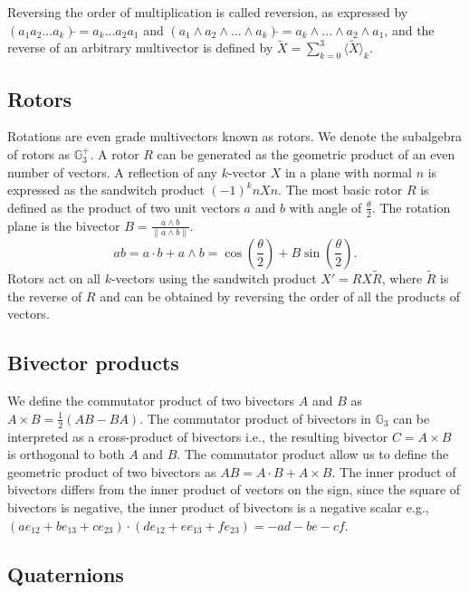 \documentclass{birkjour}
\numberwithin{equation}{section}
\begin{document}
Reversing the order of multiplication is called reversion, as expressed by $(a_1 a_2 ... a_k)\tilde{} = a_k ... a_2 a_1$ and $(a_1 \wedge a_2 \wedge ... \wedge a_k)\tilde{} = a_k \wedge ... \wedge a_2 \wedge a_1$, and the reverse of an arbitrary multivector is defined by $\tilde{X} = \sum_{k=0}^3 { \langle \tilde{X} \rangle_k }$.

\subsection{Rotors}

Rotations are even grade multivectors known as rotors. We denote the subalgebra of rotors as $\mathbb{G}^{+}_3$. A rotor $R$ can be generated as the geometric product of an even number of vectors. A reflection of any $k$-vector $X$ in a plane with normal $n$ is expressed as the sandwitch product $(-1)^k n X n$. The most basic rotor $R$ is defined as the product of two unit vectors $a$ and $b$ with angle of $\frac{\theta}{2}$. The rotation plane is the bivector $B = \frac{a \wedge b}{\| a \wedge b \|}$.
\begin{equation}
a b = a \cdot b + a \wedge b = \cos\left( \frac{\theta}{2} \right) + B \sin\left( \frac{\theta}{2} \right).
\end{equation}
Rotors act on all $k$-vectors using the sandwitch product $X' = R X \tilde R$, where $\tilde R$ is the reverse of $R$ and can be obtained by reversing the order of all the products of vectors.

\subsection{Bivector products}

We define the commutator product of two bivectors $A$ and $B$ as $A \times B = \frac{1}{2}(A B - B A)$. The commutator product of bivectors in $\mathbb{G}_3$  can be interpreted as a cross-product of bivectors i.e., the resulting bivector $C = A \times B$ is orthogonal to both $A$ and $B$. The commutator product allow us to define the geometric product of two bivectors as $A B = A \cdot B + A \times B$. The inner product of bivectors differs from the inner product of vectors on the sign, since the square of bivectors is negative, the inner product of bivectors is a negative scalar e.g., $(a e_{12} + b e_{13} + c e_{23}) \cdot (d e_{12} + e e_{13} + f e_{23}) = -a d - b e - c f$.

\subsection{Quaternions}
\end{document}
